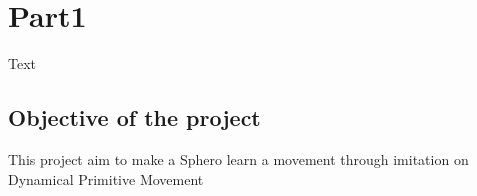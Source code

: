 \section{Part1}

   Text
    
    \subsection{Objective of the project}
    
    \vspace{0.5cm}
    \hspace{0.4cm} This project aim to make a Sphero  learn a movement through imitation on Dynamical Primitive Movement 
    